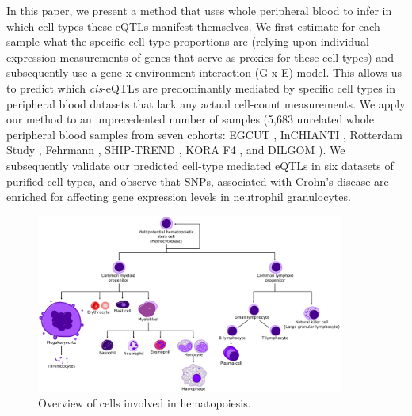   In this paper, we present a method that uses whole peripheral blood to infer in which cell-types these 
  eQTLs manifest themselves. We first estimate for each sample what the specific cell-type proportions 
  are (relying upon individual expression measurements of genes that serve as proxies for these cell-types) 
  and subsequently use a gene x environment interaction (G x E) model. This allows us to predict which 
  \emph{cis}-eQTLs are predominantly mediated by specific cell types in peripheral blood datasets that lack 
  any actual cell-count measurements. We apply our method to an unprecedented number of samples (5,683 
  unrelated whole peripheral blood samples from seven cohorts: EGCUT \cite{Metspalu:2004}, InCHIANTI 
  \cite{Tanaka:2009}, Rotterdam Study \cite{Hofman:2011}, Fehrmann \cite{Lude:2011}, SHIP-TREND 
  \cite{Teumer:2011}, KORA F4 \cite{Powell:2012, Mehta:2013}, and DILGOM \cite{Inouye:2010}). We 
  subsequently validate our predicted cell-type mediated eQTLs in six datasets of purified cell-types, and 
  observe that SNPs, associated with Crohn's disease are enriched for affecting gene expression levels in 
  neutrophil granulocytes.

  \begin{figure}[h!]
  \centering
  \includegraphics[width=0.9\textwidth]{eps/image_4_3.eps}
  \caption[Hematopoiesis overview]{Overview of cells involved in hematopoiesis. }
          \label{fig:fig4_3}
  \end{figure}

